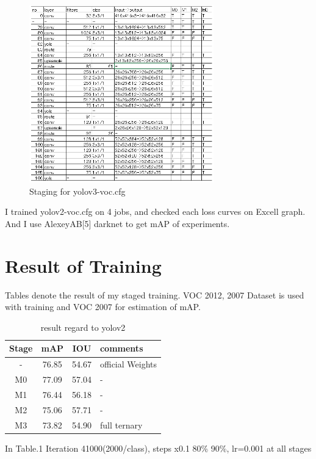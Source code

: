 \documentclass[twocolumn]{article}
\begin{document}
\begin{figure}
\includegraphics[width=8cm]{yolov3-voc_Stages.png}
\caption{Staging for yolov3-voc.cfg}
\end{figure}

I trained yolov2-voc.cfg on 4 jobs, and checked each loss curves on Excell graph.
And I use AlexeyAB[5] darknet to get mAP of experiments.

\section{Result of Training}

Tables denote the result of my staged training.
VOC 2012, 2007 Dataset is used with training and VOC 2007 for estimation of mAP.

\begin{table}[htbp]
 \centering
 \begin{tabular}{c|c|c|l}
  Stage & mAP & IOU & comments \\ \hline\hline
  -        & 76.85 & 54.67 & official Weights \\ \hline
  M0       & 77.09 & 57.04 & -                \\ \hline
  M1       & 76.44 & 56.18 & -                \\ \hline
  M2       & 75.06 & 57.71 & -                \\ \hline
  M3       & 73.82 & 54.90 & full ternary     \\ \hline\hline
 \end{tabular}
 \caption{result regard to yolov2}
 \label{tb:yolov2}
\end{table}

In Table.1 Iteration 41000(2000/class), steps x0.1 80\% 90\%, lr=0.001 at all stages
\end{document}
